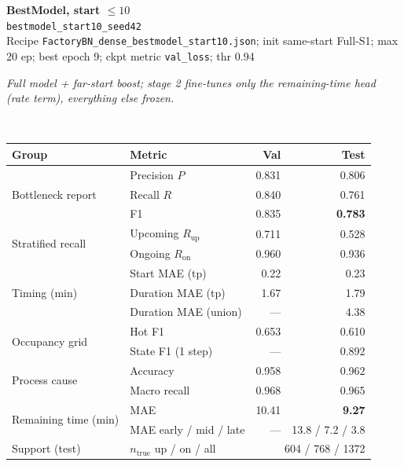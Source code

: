 \documentclass[9pt,a4paper,twocolumn]{extarticle}
\begin{document}
\noindent\begin{minipage}{\columnwidth}
\begin{center}
{\small\bfseries BestModel, start $\le 10$}\\
{\scriptsize\texttt{bestmodel\_start10\_seed42}}\\
{\scriptsize Recipe \texttt{FactoryBN\_dense\_bestmodel\_start10.json}; init same-start Full-S1; max 20 ep; best epoch 9; ckpt metric \texttt{val\_loss}; thr 0.94}\\[1pt]
\parbox{0.96\columnwidth}{\scriptsize\itshape Full model + far-start boost; stage 2 fine-tunes only the remaining-time head (rate term), everything else frozen.}\\[2pt]
\scriptsize\setlength{\tabcolsep}{3pt}
\begin{tabular}{llrr}
\toprule
Group & Metric & Val & Test \\
\midrule
\multirow{3}{*}{Bottleneck report}
  & Precision $P$ & 0.831 & 0.806 \\
  & Recall $R$ & 0.840 & 0.761 \\
  & F1 & 0.835 & \textbf{0.783} \\
\midrule
\multirow{2}{*}{Stratified recall}
  & Upcoming $R_{\mathrm{up}}$ & 0.711 & 0.528 \\
  & Ongoing $R_{\mathrm{on}}$ & 0.960 & 0.936 \\
\midrule
\multirow{3}{*}{Timing (min)}
  & Start MAE (tp) & 0.22 & 0.23 \\
  & Duration MAE (tp) & 1.67 & 1.79 \\
  & Duration MAE (union) & --- & 4.38 \\
\midrule
\multirow{2}{*}{Occupancy grid}
  & Hot F1 & 0.653 & 0.610 \\
  & State F1 (1 step) & --- & 0.892 \\
\midrule
\multirow{2}{*}{Process cause}
  & Accuracy & 0.958 & 0.962 \\
  & Macro recall & 0.968 & 0.965 \\
\midrule
\multirow{2}{*}{Remaining time (min)}
  & MAE & 10.41 & \textbf{9.27} \\
  & MAE early / mid / late & --- & 13.8 / 7.2 / 3.8 \\
\midrule
Support (test)
  & $n_{\mathrm{true}}$ up / on / all & \multicolumn{2}{r}{604 / 768 / 1372} \\
\bottomrule
\end{tabular}
\end{center}
\end{minipage}\par\vspace{6pt}
\end{document}
